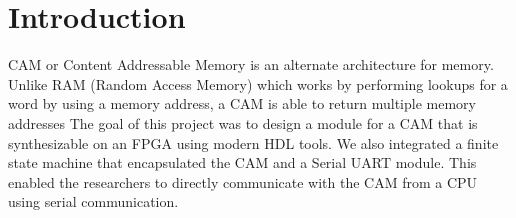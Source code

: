 \section{Introduction}
CAM or Content Addressable Memory is an alternate architecture for memory. Unlike RAM (Random Access Memory) which works by performing lookups for a word by using a memory address, a CAM is able to return multiple memory addresses 
The goal of this project was to design a module for a CAM that is synthesizable on an FPGA using modern HDL tools. 
We also integrated a finite state machine that encapsulated the CAM and a Serial UART module. 
This enabled the researchers to directly communicate with the CAM from a CPU using serial communication. 
